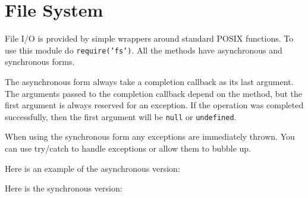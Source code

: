 \section{File System}\label{file-system}

\begin{Shaded}
\begin{Highlighting}[]
 
\end{Highlighting}
\end{Shaded}

File I/O is provided by simple wrappers around standard POSIX functions.
To use this module do \texttt{require('fs')}. All the methods have
asynchronous and synchronous forms.

The asynchronous form always take a completion callback as its last
argument. The arguments passed to the completion callback depend on the
method, but the first argument is always reserved for an exception. If
the operation was completed successfully, then the first argument will
be \texttt{null} or \texttt{undefined}.

When using the synchronous form any exceptions are immediately thrown.
You can use try/catch to handle exceptions or allow them to bubble up.

Here is an example of the asynchronous version:

\begin{Shaded}
\begin{Highlighting}[]
 \NormalTok{(}\NormalTok{);}

\NormalTok{(}\NormalTok{, } 
    
  \NormalTok{(}\NormalTok{);}
\NormalTok{\});}
\end{Highlighting}
\end{Shaded}

Here is the synchronous version:

\begin{Shaded}
\begin{Highlighting}[]
 \NormalTok{(}\NormalTok{);}

\NormalTok{(}\NormalTok{)}
\NormalTok{(}\NormalTok{);}
\end{Highlighting}
\end{Shaded}


